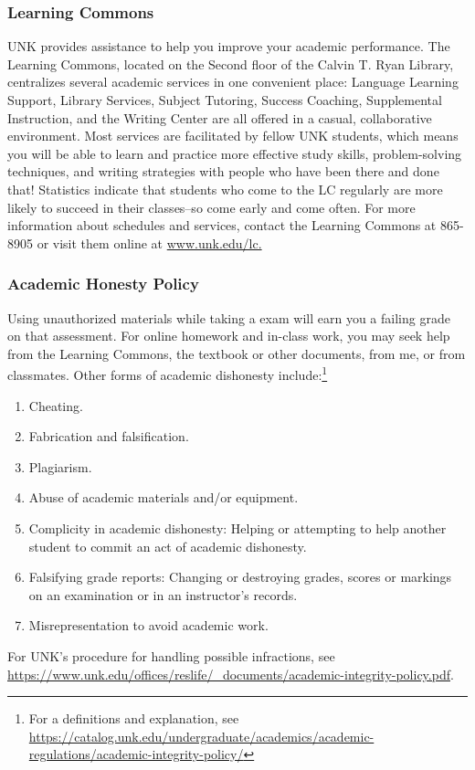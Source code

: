 \documentclass[12pt]{article}
\newcounter{ex}\setcounter{ex}{0}
\begin{document}
\subsubsection*{Learning Commons}
UNK provides assistance to help you improve your academic performance. The Learning Commons, located on the Second floor of the Calvin T. Ryan Library, centralizes several academic
services in one convenient place: Language Learning Support, Library Services, Subject Tutoring, Success Coaching, Supplemental Instruction, and the Writing Center are all
offered in a casual, collaborative environment.  Most services are facilitated by fellow UNK students, which means you will be able to learn and practice more effective
study skills, problem-solving techniques, and writing strategies with people who have been there and done that!  Statistics indicate that students who come to the LC
regularly are more likely to succeed in their classes--so come early and come often. For more information about schedules and services, contact the Learning Commons at
865-8905 or visit them online at \url{www.unk.edu/lc.}

\subsubsection*{Academic Honesty Policy}

Using unauthorized materials while taking a exam will earn you a failing grade on that assessment. For online homework and in-class work, you may seek help from the Learning Commons, the textbook or other documents, from me, or from classmates.  Other forms of academic dishonesty  include:\footnote{For a definitions and explanation, see \url{https://catalog.unk.edu/undergraduate/academics/academic-regulations/academic-integrity-policy/}}

\begin{enumerate}

 \item  Cheating.

 \item Fabrication and falsification.

 \item Plagiarism.

 \item Abuse of academic materials and/or equipment.

 \item Complicity in academic dishonesty: Helping or attempting to help another student to commit an act of academic dishonesty.

   \item  Falsifying grade reports: Changing or destroying grades, scores or markings on an examination or in an instructor's records.

   \item Misrepresentation to avoid academic work.

 \end{enumerate}
For UNK's procedure for handling possible infractions, see \url{https://www.unk.edu/offices/reslife/_documents/academic-integrity-policy.pdf}.
\end{document}
